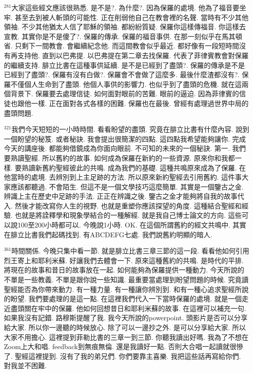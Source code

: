 \documentclass{book}
\begin{document}
$^{281}$大家這些經文應該很熟悉.
是不是?.
為什麼?.
因為保羅的處境.
他為了福音要坐牢.
甚至去到被人斬頭的可能性.
正在削弱他自己在教會裡的名聲.
當時有不少其他領袖.
不少其他猶太人信了耶穌的領袖.
都紛紛質疑.
保羅你這樣傳福音.
你這樣去宣教.
其實你是不是傻了?.
保羅的傳承.
保羅的福音事供.
在那一刻似乎在馬其頓省.
只剩下一間教會.
會繼續紀念他.
而這間教會似乎最近.
都好像有一段短時間沒有再支持他.
直到以巴弗提.
以巴弗提在第二章去找保羅.
代表了菲律賓教會對保羅的繼續支持.
腓立比書在這種事供延續.
是不是已經到了盡頭?.
保羅的傳承是不是已經到了盡頭?.
保羅有沒有白做?.
保羅會不會做了這麼多.
最後什麼渣都沒有?.
保羅不僅個人生命到了盡頭.
他個人事供的影響力.
也似乎到了盡頭的危機.
就在這兩個背景下.
保羅要去處理信徒.
如何面對眼前的苦難.
眼前的逼迫.
因為菲律賓的信徒也跟他一樣.
正在面對各式各樣的困難.
保羅也在最後.
曾經有處理過世界中局的盡頭問題.

$^{321}$我們今天短短的一小時時間.
看看盼望的盡頭.
究竟在腓立比書有什麼內容.
說到一個盼望的秘笈.
或者秘訣.
我會提出很簡潔的四點.
這四點我希望能夠讓你.
完成今天的講座後.
都能夠借鏡成為你面向眼前.
不可知的未來的一個秘訣.
第一.
我們要熟讀聖經.
所以舊約的故事.
如何成為保羅在新約的一些資源.
原來你和我都一樣.
要熟讀新舊約聖經彼此的共鳴.
成為我們的基礎.
這種共鳴原來成為了保羅.
在他當時的處境.
去辨別到上主足跡的方法.
所以原來新約聖經去引用舊約.
這件事大家應該都聽過.
不會陌生.
但這不是一個文學技巧這麼簡單.
其實是一個鑒古之金.
辨識上主在歷史中足跡的手法.
正正在辨識之後.
鑒古之金才能夠將自我的故事代入.
然後才能改寫你人生的視野.
也就是重塑你應該探望的角度.
這種結合聖經和經驗.
也就是將詮釋學和現象學結合的一種解經.
就是我自己博士論文的方向.
這些可以說100至200小時都可以.
今晚說1小時.
OK.
在這個所謂舊約的經文共鳴中.
其實在腓立比書我們起碼找到.
有ABCDEFG七處.
我們說舊約明顯的暗人.

$^{361}$時間關係.
今晚只集中看一節.
就是腓立比書三章三節的這一段.
看看他如何引用烈王寄上和耶利米蘇.
好讓我們去體會一下.
原來這種舊約的共鳴.
是時代的平排.
將現在的故事和昔日的故事放在一起.
如何能夠為保羅提供一種動力.
今天所說的不單是一些教義.
不單是跟你說一些知識.
最重要當處理到盼望問題的時候.
究竟讀聖經能否為你帶來動力.
有一種力量.
有一種讓你辨別到.
和有一種心追求聖經所說的盼望.
我們要處理的是這一點.
在這裡我們代入一下當時保羅的處境.
就是一個走近盡頭關在牢中的保羅.
他如何回想昔日和耶利米蘇的故事.
在這裡可以補充一句.
如果我沒有記錯.
路穆斯提醒了我.
我今天所說的powerpoint.
頭影片是否可以分享給大家.
所以你一邊聽的時候放心.
除了可以一邊抄之外.
是可以分享給大家.
所以大家不用擔心.
這裡提到菲勒比書的三章一到三節.
你聽我讀出好嗎.
我為了不想在Zoom上大和唱.
feedback到無痕無倫.
還是我讀好一點.
否則大合唱一起讀就很慘了.
聖經這裡提到.
沒有了我的弟兄們.
你們要靠主喜樂.
我把這些話再寫給你們.
對我並不困難.
\end{document}
